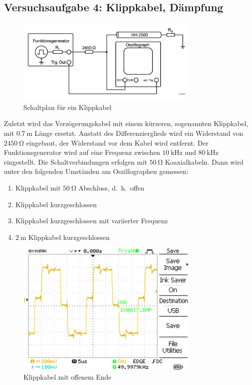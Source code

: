 \documentclass{article}
\begin{document}
\subsection{Versuchsaufgabe 4: Klippkabel, Dämpfung}
			\begin{figure}[H]
				\centering
				\includegraphics[width=0.8\textwidth]{figs/Aufbau_1_4_Klippkabel.png}
				\caption{Schaltplan für ein Klippkabel~\cite{anleitung}}
				\label{fig:aufbau_1_4_klippkabel}
			\end{figure}
			Zuletzt wird das Verzögerungskabel mit einem kürzeren, sogenannten Klippkabel, mit $\SI{0.7}{\meter}$ Länge ersetzt. Anstatt des Differenzierglieds wird ein Widerstand von $\SI{2450}{\ohm}$ eingebaut, der Widerstand vor dem Kabel wird entfernt. Der Funktionsgenerator wird auf eine Frequenz zwischen $\SI{10}{\kilo\hertz}$ und $\SI{80}{\kilo\hertz}$ eingestellt. Die Schaltverbindungen erfolgen mit $\SI{50}{\ohm}$ Koaxialkabeln. Dann wird unter den folgenden Umständen am Oszillographen gemessen:
			\begin{enumerate}[label=\alph*]
				\item Klippkabel mit $\SI{50}{\ohm}$ Abschluss, d.\ h.\ offen
				\item Klippkabel kurzgeschlossen
				\item Klippkabel kurzgeschlossen mit variierter Frequenz
				\item $\SI{2}{\meter}$ Klippkabel kurzgeschlossen 
			\end{enumerate}

				\begin{figure}[H]
					\centering
					\includegraphics[width=0.8\textwidth]{MesswerteVersuch1/DS0017.png}
					\caption{Klippkabel mit offenem Ende}
					\label{fig:DS0017}
				\end{figure}
\end{document}
